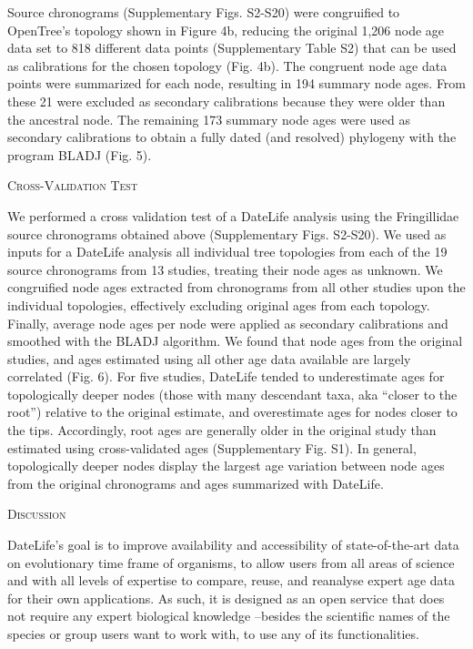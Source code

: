 \documentclass[english,man]{apa6}
\begin{document}
Source chronograms (Supplementary Figs. S2-S20) were congruified to OpenTree's topology shown in Figure 4b, reducing the original 1,206 node age data set to 818 different data points (Supplementary Table S2) that can be used as calibrations for the chosen topology (Fig. 4b). The congruent node age data points were summarized for each node, resulting in 194 summary node ages. From these 21 were excluded as secondary calibrations because they were older than the ancestral node. The remaining 173 summary node ages were used as secondary calibrations to obtain a fully dated (and resolved) phylogeny with the program BLADJ (Fig. 5).

\begin{center}
\textsc{Cross-Validation Test}
\end{center}

We performed a cross validation test of a DateLife analysis using the Fringillidae source chronograms obtained above (Supplementary Figs. S2-S20).
We used as inputs for a DateLife analysis all individual tree topologies from each of the 19 source chronograms from 13 studies, treating their node ages as unknown.
We congruified node ages extracted from chronograms from all other studies upon the individual topologies, effectively excluding original ages from each topology. Finally, average node ages per node were applied as secondary calibrations and smoothed with the BLADJ algorithm.
We found that node ages from the original studies, and ages estimated using all other age data available are largely correlated (Fig. 6).
For five studies, DateLife tended to underestimate ages for topologically deeper nodes (those with many descendant taxa, aka \enquote{closer to the root}) relative to the original estimate, and overestimate ages for nodes closer to the tips. Accordingly, root ages are generally older in the original study than estimated using cross-validated ages (Supplementary Fig. S1).
In general, topologically deeper nodes display the largest age variation between node ages from the original chronograms and ages summarized with DateLife.

\begin{center}
\textsc{Discussion}
\end{center}

DateLife's goal is to improve availability and accessibility of state-of-the-art data on evolutionary time frame of organisms, to allow users from all areas of science and with all levels of expertise to compare, reuse, and reanalyse expert age data for their own applications. As such, it is designed as an open service that does not require any expert biological knowledge --besides the scientific names of the species or group users want to work with, to use any of its functionalities.
\end{document}
